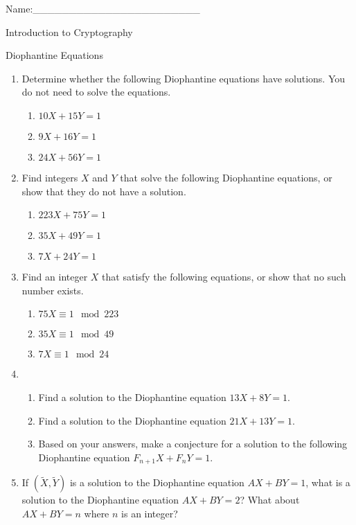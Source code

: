 \documentclass[12pt]{amsart}
\theoremstyle{definition}
\theoremstyle{remark}
\numberwithin{equation}{section}
\begin{document}
\begin{flushright}
Name:\_\_\_\_\_\_\_\_\_\_\_\_\_\_\_\_\_\_\_\_\_\_\_
\end{flushright}
\vspace{10pt}
\begin{center}
Introduction to Cryptography

Diophantine Equations
\end{center}


\begin{enumerate}
\item Determine whether the following Diophantine equations have solutions. You do not need to solve the equations.
\begin{enumerate}
\item $10X+15Y=1$
\item $9X+16Y=1$
\item $24X+56Y=1$
\end{enumerate}
\item Find integers $X$ and $Y$ that solve the following Diophantine equations, or show that they do not have a solution.
\begin{enumerate}
\item $223X+75Y=1$
\item $35X+49Y=1$
\item $7X+24Y=1$
\end{enumerate}
\item Find an integer $X$ that satisfy the following equations, or show that no such number exists. 
\begin{enumerate}
\item $75X\equiv 1\mod 223$
\item $35X\equiv 1 \mod 49$
\item $7X\equiv 1 \mod 24$
\end{enumerate}
\item
\begin{enumerate}
\item Find a solution to the Diophantine equation $13X+8Y=1$.
\item Find a solution to the Diophantine equation $21X+13Y=1$.
\item Based on your answers, make a conjecture for a solution to the following Diophantine equation $F_{n+1}X+F_{n}Y=1$.
\end{enumerate}
\item If $(\widetilde{X},\widetilde{Y})$ is a solution to the Diophantine equation $AX+BY=1$, what is a solution to the Diophantine equation $AX+BY=2$? What about $AX+BY=n$ where $n$ is an integer?

\end{enumerate}
\end{document}
